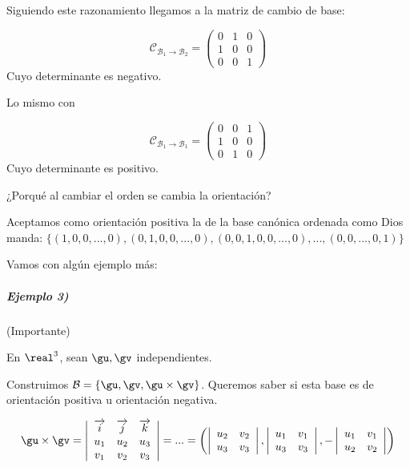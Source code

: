 Siguiendo este razonamiento llegamos a la matriz de cambio de base:

\[\mathcal{C}_{\mathcal{B}_1\to\mathcal{B}_2} = \begin{pmatrix} 0 & 1 & 0 \\ 1 & 0 & 0 \\ 0 & 0 & 1 \end{pmatrix}\]
Cuyo determinante es negativo.

Lo mismo con

\[\mathcal{C}_{\mathcal{B}_1\to\mathcal{B}_1} = \begin{pmatrix} 0 & 0 & 1 \\ 1 & 0 & 0 \\ 0 & 1 & 0 \end{pmatrix}\]
Cuyo determinante es positivo.

¿Porqué al cambiar el orden se cambia la orientación?

\obs Aceptamos como orientación positiva la de la base canónica ordenada como Dios manda: $\{(1,0,0,...,0), (0,1,0,0,...,0), (0,0,1,0,0,...,0),...,(0,0,...,0,1)\}$

Vamos con algún ejemplo más:

\subparagraph{Ejemplo 3)} (Importante)

En $\real^3$, sean $\gu,\gv$ independientes.

Construimos $\mathcal{B} = \{\gu,\gv,\gu\times\gv\}$. Queremos saber si esta base es de orientación positiva u orientación negativa.

\[\gu\times\gv = \left|
\begin{array}{ccc}
 \overrightarrow{i} & \overrightarrow{j} & \overrightarrow{k}\\
u_1 & u_2 & u_3 \\
v_1 & v_2 & v_3
 \end{array}\right| = ... = \left(\left|\begin{array}{cc}u_2&v_2\\u_3&v_3\end{array}\right|,\left|\begin{array}{cc}u_1&v_1\\u_3&v_3\end{array}\right|,-\left|\begin{array}{cc}u_1&v_1\\u_2&v_2\end{array}\right|\right)\]

